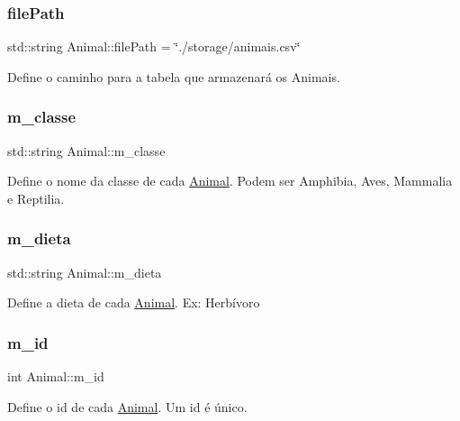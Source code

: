 \subsubsection{\texorpdfstring{file\+Path}{filePath}}
{\footnotesize\ttfamily std\+::string Animal\+::file\+Path = \char`\"{}./storage/animais.\+csv\char`\"{}\hspace{0.3cm}{\ttfamily [static]}}

Define o caminho para a tabela que armazenará os Animais. \mbox{\label{classAnimal_a8a4d049b481ab0fe88015cde7557d281}} 
\subsubsection{\texorpdfstring{m\+\_\+classe}{m\_classe}}
{\footnotesize\ttfamily std\+::string Animal\+::m\+\_\+classe\hspace{0.3cm}{\ttfamily [protected]}}

Define o nome da classe de cada \hyperlink{classAnimal}{Animal}. Podem ser Amphibia, Aves, Mammalia e Reptilia. \mbox{\label{classAnimal_af7ea074464d9a468f7412a2165afd553}} 
\subsubsection{\texorpdfstring{m\+\_\+dieta}{m\_dieta}}
{\footnotesize\ttfamily std\+::string Animal\+::m\+\_\+dieta\hspace{0.3cm}{\ttfamily [protected]}}

Define a dieta de cada \hyperlink{classAnimal}{Animal}. Ex\+: Herbívoro \mbox{\label{classAnimal_a1a39448480e098fc74b5b67c4921a5ec}} 
\subsubsection{\texorpdfstring{m\+\_\+id}{m\_id}}
{\footnotesize\ttfamily int Animal\+::m\+\_\+id\hspace{0.3cm}{\ttfamily [protected]}}

Define o id de cada \hyperlink{classAnimal}{Animal}. Um id é único. \mbox{\label{classAnimal_adea60068908c590e8f92b2680023f8ce}} 
